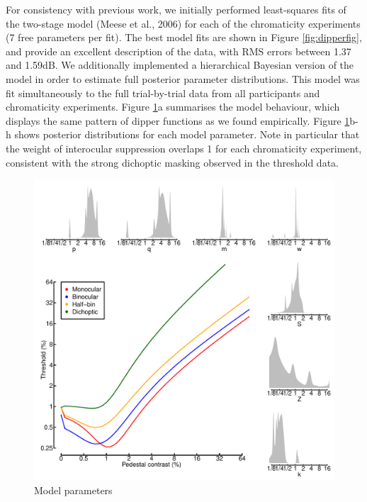 \documentclass[
]{article}
\begin{document}
For consistency with previous work, we initially performed least-squares fits of the two-stage model (Meese et al., 2006) for each of the chromaticity experiments (7 free parameters per fit). The best model fits are shown in Figure \ref{fig:dipperfig}, and provide an excellent description of the data, with RMS errors between 1.37 and 1.59dB. We additionally implemented a hierarchical Bayesian version of the model in order to estimate full posterior parameter distributions. This model was fit simultaneously to the full trial-by-trial data from all participants and chromaticity experiments. Figure \ref{fig:bayesianmodel}a summarises the model behaviour, which displays the same pattern of dipper functions as we found empirically. Figure \ref{fig:bayesianmodel}b-h shows posterior distributions for each model parameter. Note in particular that the weight of interocular suppression overlaps 1 for each chromaticity experiment, consistent with the strong dichoptic masking observed in the threshold data.

\begin{figure}

{\centering \includegraphics{Figures/stanoutput} 

}

\caption{Model parameters}\label{fig:bayesianmodel}
\end{figure}
\end{document}
